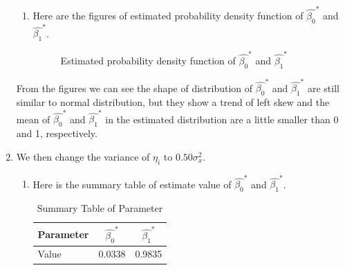 \documentclass[12pt,letterpaper]{article}
\begin{document}
\begin{enumerate}[label=\textbf{(\Alph*)}]
\begin{enumerate}[label=(\roman*)]
\item Here are the figures of estimated probability density function of $\hat{\beta_0}^{*}$ and $\hat{\beta_1}^{*}$.
\begin{figure}[H]
	\centering
	\caption{Estimated probability density function of $\hat{\beta_0}^{*}$ and $\hat{\beta_1}^{*}$}
\end{figure}
\end{enumerate}
From the figures we can see the shape of distribution of $\hat{\beta_0}^{*}$ and $\hat{\beta_1}^{*}$ are still similar to normal distribution, but they show a trend of left skew and the mean of $\hat{\beta_0}^{*}$ and $\hat{\beta_1}^{*}$ in the estimated distribution are a little smaller than 0 and 1, respectively.\\
\newpage


\item 
We then change the variance of $\eta_i$ to $0.50\sigma_x^2$.
\begin{enumerate}[label=(\roman*)]
	\item Here is the summary table of estimate value of $\hat{\beta_0}^{*}$ and $\hat{\beta_1}^{*}$.
	\begin{table}[ht]
		\footnotesize
		\caption{Summary Table of Parameter}
		\centering %
		\begin{tabular}{lcc} %
			
			\hline%
			\hline %
			Parameter&$\hat{\beta_0}^{*}$ & $\hat{\beta_1}^{*}$\\ \hline
			Value&0.0338&0.9835\\
			\hline %
			

\end{tabular}
\end{table}
\end{enumerate}
\end{enumerate}
\end{document}
